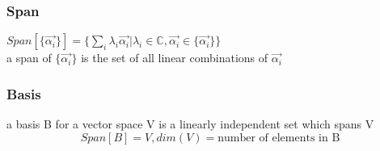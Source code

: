\documentclass[12pt, a4paper]{article}
\begin{document}
\subsubsection{Span}
$Span[\{\vec{\alpha_i}\}]=\{\sum_i \lambda_i\vec{\alpha_i}|\lambda_i\in \mathbb{C}, \vec{\alpha_i}\in \{\vec{\alpha_i}\}\}$\\
a span of $\{\vec{\alpha_i}\}$ is the set of all linear combinations of $\vec{\alpha_i}$
\subsubsection{Basis}
a basis B for a vector space V is a linearly independent set which spans V $$Span[B]=V,dim(V)=\text{number of elements in B}$$
\end{document}
